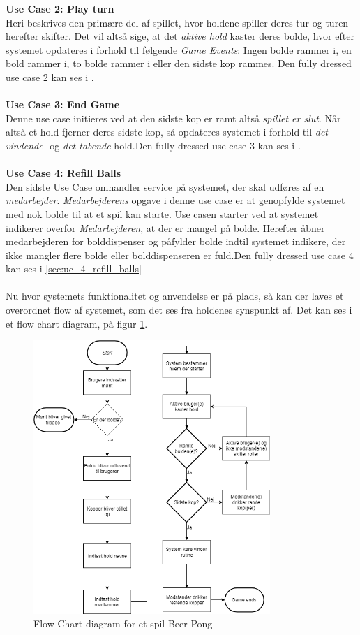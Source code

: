 \documentclass[Rapport/Rapport_main.tex]{subfiles}
\begin{document}
\textbf{Use Case 2: Play turn}\\
Heri beskrives den primære del af spillet, hvor holdene spiller deres tur og turen herefter skifter. Det vil altså sige, at det \textit{aktive hold} kaster deres bolde, hvor efter systemet opdateres i forhold til følgende \textit{Game Events}: Ingen bolde rammer i, en bold rammer i, to bolde rammer i eller den sidste kop rammes. Den fully dressed use case 2 kan ses i .\\\\
\textbf{Use Case 3: End Game}\\
Denne use case initieres ved at den sidste kop er ramt altså \textit{spillet er slut}. Når altså et hold fjerner deres sidste kop, så opdateres systemet i forhold til \textit{det vindende-} og \textit{det tabende}-hold.Den fully dressed use case 3 kan ses i .\\\\
\textbf{Use Case 4: Refill Balls}\\
Den sidste Use Case omhandler service på systemet, der skal udføres af en \textit{medarbejder}. \textit{Medarbejderens} opgave i denne use case er at genopfylde systemet med nok bolde til at et spil kan starte. Use casen starter ved at systemet indikerer overfor \textit{Medarbejderen}, at der er mangel på bolde. Herefter åbner medarbejderen for bolddispenser og påfylder bolde indtil systemet indikere, der ikke mangler flere bolde eller bolddispenseren er fuld.Den fully dressed use case 4 kan ses i \ref{sec:uc_4_refill_balls}\\\\
Nu hvor systemets funktionalitet og anvendelse er på plads, så kan der laves et overordnet flow af systemet, som det ses fra holdenes synspunkt af. Det kan ses i et flow chart diagram, på figur \ref{fig:rap_beer_pong_flow}.
\begin{figure}[H]
    \centering
    \includegraphics[width=0.8\textwidth]{Kravspecifikation/Flowchart/pics/Beerpongflowchart.png}
    \caption{Flow Chart diagram for et spil Beer Pong}
    \label{fig:rap_beer_pong_flow}
\end{figure}
\end{document}
